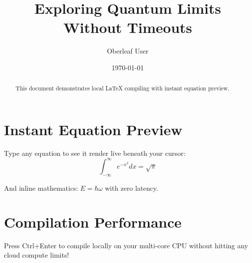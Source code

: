 \documentclass{article}
\title{Exploring Quantum Limits Without Timeouts}
\author{Oberleaf User}
\date{\today}
\begin{document}
\maketitle

\begin{abstract}
This document demonstrates local LaTeX compiling with instant equation preview.
\end{abstract}

\section{Instant Equation Preview}
Type any equation to see it render live beneath your cursor:
\begin{equation}
  \int_{-\infty}^{\infty} e^{-x^2} dx = \sqrt{\pi}
\end{equation}

And inline mathematics: $E = \hbar \omega$ with zero latency.

\section{Compilation Performance}
Press Ctrl+Enter to compile locally on your multi-core CPU without hitting any cloud compute limits!
\end{document}

